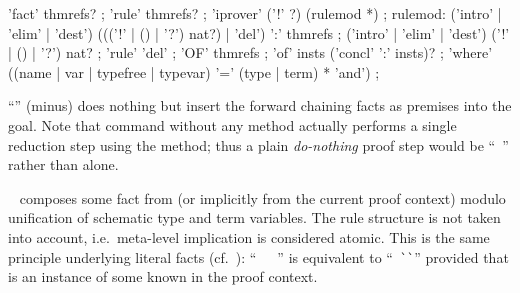 \begin{isabellebody}
\begin{isamarkuptext}
  \begin{rail}
    'fact' thmrefs?
    ;
    'rule' thmrefs?
    ;
    'iprover' ('!' ?) (rulemod *)
    ;
    rulemod: ('intro' | 'elim' | 'dest') ((('!' | () | '?') nat?) | 'del') ':' thmrefs
    ;
    ('intro' | 'elim' | 'dest') ('!' | () | '?') nat?
    ;
    'rule' 'del'
    ;
    'OF' thmrefs
    ;
    'of' insts ('concl' ':' insts)?
    ;
    'where' ((name | var | typefree | typevar) '=' (type | term) * 'and')
    ;
  \end{rail}

  \begin{descr}
  
  \item [``\hyperlink{method.-}{\mbox{\isa{{\isacharminus}}}}'' (minus)] does nothing but insert the
  forward chaining facts as premises into the goal.  Note that command
  \hyperlink{command.proof}{\mbox{}} without any method actually performs a single
  reduction step using the \hyperlink{method.rule}{\mbox{}} method; thus a plain
  \emph{do-nothing} proof step would be ``\hyperlink{command.proof}{\mbox{}}~\isa{{\isachardoublequote}{\isacharminus}{\isachardoublequote}}'' rather than \hyperlink{command.proof}{\mbox{}} alone.
  
  \item [\hyperlink{method.fact}{\mbox{\isa{fact}}}~\isa{{\isachardoublequote}a\isactrlsub {\isadigit{1}}\ {\isasymdots}\ a\isactrlsub n{\isachardoublequote}}] composes
  some fact from  (or implicitly from
  the current proof context) modulo unification of schematic type and
  term variables.  The rule structure is not taken into account, i.e.\
  meta-level implication is considered atomic.  This is the same
  principle underlying literal facts (cf.\ \secref{sec:syn-att}):
  ``\hyperlink{command.have}{\mbox{\isa{\isacommand{have}}}}~\isa{{\isachardoublequote}{\isasymphi}{\isachardoublequote}}~\hyperlink{command.by}{\mbox{}}~'' is
  equivalent to ``\hyperlink{command.note}{\mbox{\isa{\isacommand{note}}}}~\verb|`|\isa{{\isasymphi}}\verb|`|'' provided that \isa{{\isachardoublequote}{\isasymturnstile}\ {\isasymphi}{\isachardoublequote}} is an instance of some known
  \isa{{\isachardoublequote}{\isasymturnstile}\ {\isasymphi}{\isachardoublequote}} in the proof context.
  

\end{descr}
\end{isamarkuptext}
\end{isabellebody}
